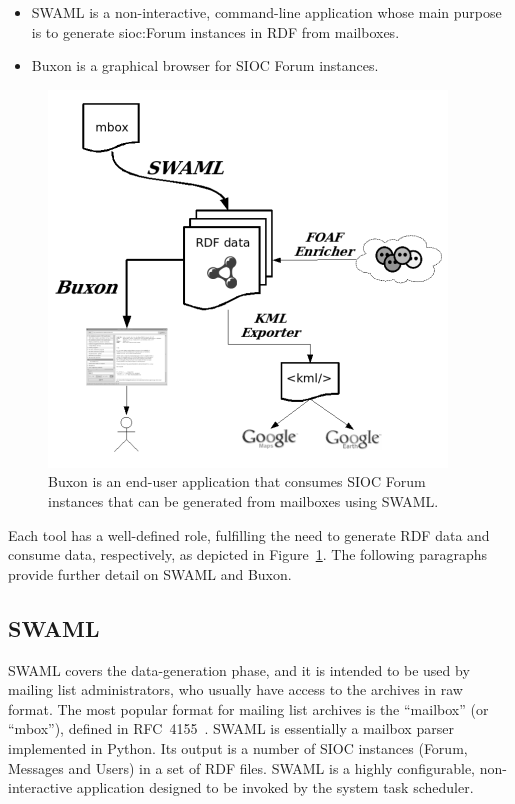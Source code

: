 \documentclass{llncs}
\begin{document}
\begin{itemize}
  \item SWAML is a non-interactive, command-line application whose main
	purpose is to generate \textsf{sioc:Forum} instances in RDF from
	mailboxes.
  \item Buxon is a graphical browser for SIOC \textsf{Forum} instances.
\end{itemize}

\begin{figure}[ht]
 \centering
 \includegraphics[bb=0 0 300 283]{images/swaml.png}
 \caption{\label{fig:swaml-and-buxon}Buxon is an end-user application
that consumes SIOC
\textsf{Forum} instances that can be generated from mailboxes
using SWAML.}
\end{figure}

Each tool has a well-defined role, fulfilling the need to
generate RDF data and consume data, respectively, as depicted
in Figure~\ref{fig:swaml-and-buxon}. The following paragraphs
provide further detail on SWAML and Buxon.

\subsection{SWAML}

SWAML covers the data-generation phase, and it is intended to be
used by mailing list administrators, who usually have access to
the archives in raw format. The most popular format for
mailing list archives is the ``mailbox'' (or ``mbox''), defined
in RFC~4155~\cite{RFC4155}. SWAML is essentially a mailbox parser
implemented in Python. Its output is a number of SIOC instances
(\textsf{Forum}, \textsf{Message}s and \textsf{User}s) in a set
of RDF files. SWAML is a highly configurable, non-interactive
application designed to be invoked by the system task scheduler.
\end{document}
